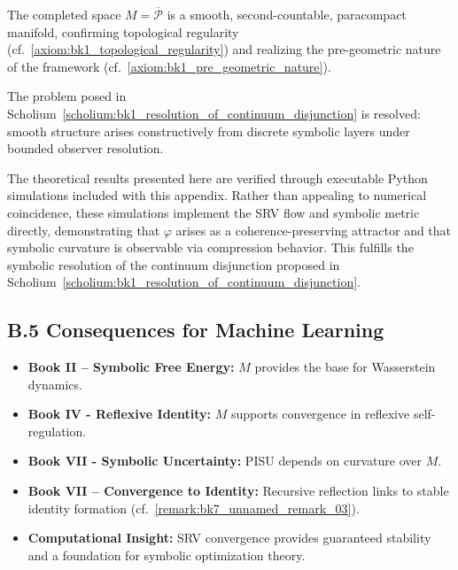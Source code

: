 \begin{theorem}
\label{theorem:appB_smoothness_emergence}
The completed space $M = \overline{\mathcal{P}}$ is a smooth, second-countable, paracompact manifold, confirming topological regularity (cf.~\ref{axiom:bk1_topological_regularity}) and realizing the pre-geometric nature of the framework (cf.~\ref{axiom:bk1_pre_geometric_nature}).
\end{theorem}

\begin{corollary}
\label{corollary:appB_resolution_of_smoothness}
The problem posed in Scholium~\ref{scholium:bk1_resolution_of_continuum_disjunction} is resolved: smooth structure arises constructively from discrete symbolic layers under bounded observer resolution.
\end{corollary}

\begin{remark}
\label{remark:appB_executable_resolution_smoothness}
The theoretical results presented here are verified through executable Python simulations included with this appendix. 
Rather than appealing to numerical coincidence, these simulations implement the SRV flow and symbolic metric directly, 
demonstrating that $\varphi$ arises as a coherence-preserving attractor and that symbolic curvature is observable via compression behavior.
This fulfills the symbolic resolution of the continuum disjunction proposed in Scholium~\ref{scholium:bk1_resolution_of_continuum_disjunction}.
\end{remark}

\subsection*{B.5 Consequences for Machine Learning}
\label{subsec:appB_ml_consequences}

\begin{itemize}
\item \textbf{Book II -- Symbolic Free Energy:} $M$ provides the base for Wasserstein dynamics.
\item \textbf{Book IV - Reflexive Identity:} $M$ supports convergence in reflexive self-regulation.
\item \textbf{Book VII - Symbolic Uncertainty:} PISU depends on curvature over $M$.
\item \textbf{Book VII -- Convergence to Identity:} Recursive reflection links to stable identity formation (cf.~\ref{remark:bk7_unnamed_remark_03}).
\item \textbf{Computational Insight:} SRV convergence provides guaranteed stability and a foundation for symbolic optimization theory.
\end{itemize}

